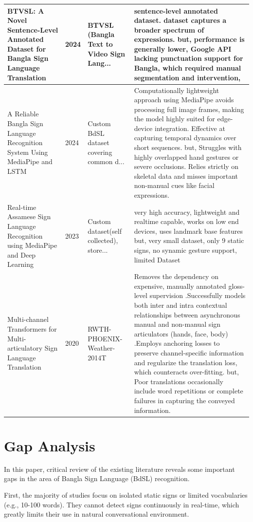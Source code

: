 \begin{longtable}{|p{4cm}|p{1cm}|p{3cm}|p{5.5cm}|}
BTVSL: A Novel Sentence-Level Annotated Dataset for Bangla Sign Language Translation \cite{study_btvsl_2024} & 2024 & BTVSL (Bangla Text to Video Sign Lang... & sentence-level annotated dataset. dataset captures a broader spectrum of expressions. but, performance is generally lower, Google API lacking punctuation support for Bangla, which required manual segmentation and intervention, \\ \hline
A Reliable Bangla Sign Language Recognition System Using MediaPipe and LSTM \cite{study_reliable_mediapipe_2024} & 2024 & Custom BdSL dataset covering common d... & Computationally lightweight approach using MediaPipe avoids processing full image frames, making the model highly suited for edge-device integration. Effective at capturing temporal dynamics over short sequences. but, Struggles with highly overlapped hand gestures or severe occlusions. Relies strictly on skeletal data and misses important non-manual cues like facial expressions. \\ \hline
Real-time Assamese Sign Language Recognition using MediaPipe and Deep Learning \cite{study_assamese_slr_2023} & 2023 & Custom dataset(self collected), store... & very high accuracy, lightweight and realtime capable, works on low end devices, uses landmark base features but, very small dataset, only 9 static signs, no synamic gesture support, limited Dataset\\ \hline
Multi-channel Transformers for Multi-articulatory Sign Language Translation \cite{study_multichannel_trans_2020} & 2020 & RWTH-PHOENIX-Weather-2014T & Removes the dependency on expensive, manually annotated gloss-level supervision .Successfully models both inter and intra contextual relationships between asynchronous manual and non-manual sign articulators (hands, face, body) .Employs anchoring losses to preserve channel-specific information and regularize the translation loss, which counteracts over-fitting. but, Poor translations occasionally include word repetitions or complete failures in capturing the conveyed information. \\ \hline
\end{longtable}

\section{Gap Analysis}
In this paper, critical review of the existing literature reveals some important gaps in the area of Bangla Sign Language (BdSL) recognition.

    First, the majority of studies focus on isolated static signs or limited vocabularies (e.g., 10-100 words). They cannot detect signs continuously in real-time, which greatly limits their use in natural conversational environment.
    
